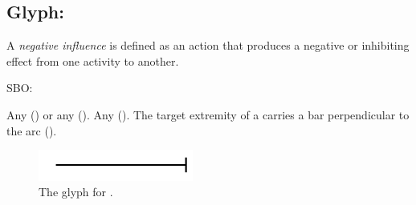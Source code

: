 \subsection{Glyph: }
\label{sec:af:negative_infl}

A \emph{negative influence} is defined as an action that produces a negative or inhibiting effect from one activity to another.

\begin{glyphDescription}

\glyphSboTerm SBO:

 \glyphOrigin Any  () or any  ().
 \glyphTarget Any  ().
 \glyphEndPoint The target extremity of a  carries a bar perpendicular to the arc ().


\end{glyphDescription}

\begin{figure}[H]
  \centering
  \includegraphics[width = 2in]{images/negativeInfluence}
  \caption{The \AF glyph for .}
  \label{fig:af:negativeInfl}
\end{figure}
